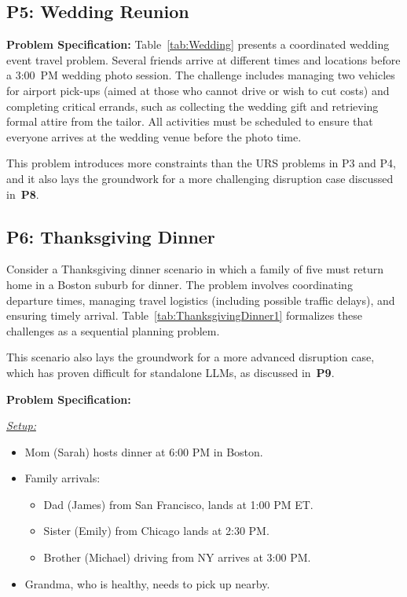 
\subsection*{P5: Wedding Reunion}

\noindent \textbf{Problem Specification:} Table~\ref{tab:Wedding} presents a coordinated wedding event travel problem. Several friends arrive at different times and locations before a 3:00~PM wedding photo session. The challenge includes managing two vehicles for airport pick-ups (aimed at those who cannot drive or wish to cut costs) and completing critical errands, such as collecting the wedding gift and retrieving formal attire from the tailor. All activities must be scheduled to ensure that everyone arrives at the wedding venue before the photo time.

This problem introduces more constraints than the URS problems in P3 and P4, and it also lays the groundwork for a more challenging disruption case discussed in~\textbf{P8}.


\subsection*{\textbf{P6:} Thanksgiving Dinner}

Consider a Thanksgiving dinner scenario in which a family of five must return home in a Boston suburb for dinner. The problem involves coordinating departure times, managing travel logistics (including possible traffic delays), and ensuring timely arrival. Table~\ref{tab:ThanksgivingDinner1} formalizes these challenges as a sequential planning problem.

This scenario also lays the groundwork for a more advanced disruption case, which has proven difficult for standalone LLMs, as discussed in~\textbf{P9}.

\noindent \textbf{Problem Specification:}

\noindent \underline{\textit{Setup:}}
\begin{itemize}[leftmargin=1.5em, topsep=-.0em, parsep=-.0em, label=*]
\item Mom (Sarah) hosts dinner at 6:00 PM in Boston.
\item Family arrivals:
  \begin{itemize}[leftmargin=1em, topsep=-.0em, parsep=-.0em,]
  \item Dad (James) from San Francisco, lands at 1:00 PM ET.
  \item Sister (Emily) from Chicago lands at 2:30 PM.
  \item Brother (Michael) driving from NY arrives at 3:00 PM.
  \end{itemize}
\item Grandma, who is healthy, needs to pick up nearby.
\end{itemize}

